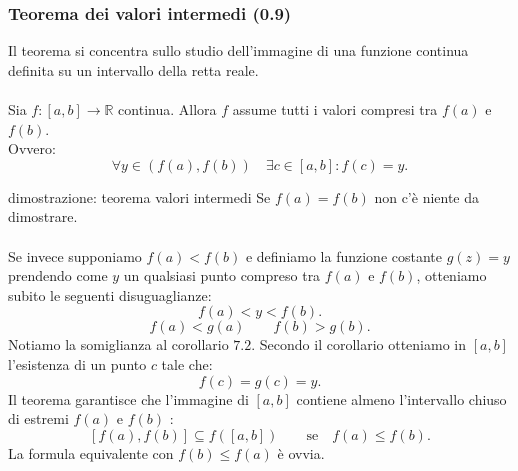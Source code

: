 \documentclass[x11names]{article}
\begin{document}
\begin{center}
\colorbox{myred}{\begin{minipage}{5.75in}
\begin{redes}{}
\subsubsection{Teorema dei valori intermedi (0.9)}
Il teorema si concentra sullo studio dell'immagine di una funzione continua definita su un intervallo  della retta reale.
\\ \\
Sia $f:\left[a,b\right] \rightarrow \mathbb{R}$ continua. Allora $f$ assume tutti i valori compresi tra $f\left(a\right)$ e $f\left(b\right)$.
\\
Ovvero:
\[
	\forall y \in \left(f\left(a\right),f\left(b\right)\right) \quad \exists c \in \left[a,b\right] : f\left(c\right) = y
.\] 


\begin{center}

\end{center}
\end{redes}
\end{minipage}}        
\end{center}


\begin{es}{dimostrazione: teorema valori intermedi}
Se $f\left(a\right) = f\left(b\right)$ non c'è niente da dimostrare.
\\ \\
Se invece supponiamo $f\left(a\right) < f\left(b\right)$ e definiamo la funzione costante $g\left(z\right) = y$ prendendo come $y$ un qualsiasi punto compreso tra $f\left(a\right)$ e $f\left(b\right)$, otteniamo subito le seguenti disuguaglianze:
\[
f\left(a\right) < y < f\left(b\right)
.\] 
\[
f\left(a\right) < g\left(a\right) \qquad f\left(b\right) > g\left(b\right)
.\] 
Notiamo la somiglianza al corollario $7.2$. Secondo il corollario otteniamo in  $\left[a,b\right]$ l'esistenza di un punto $c$ tale che:
\[
f\left(c\right) = g\left(c\right) = y
.\] 
Il teorema garantisce che l'immagine di $\left[a,b\right]$ contiene almeno l'intervallo chiuso di estremi $f\left(a\right)$ e $f\left(b\right)$ :
\[
	\left[f\left(a\right),f\left(b\right)\right] \subseteq f\left(\left[a,b\right]\right) \qquad \text{se} \quad f\left(a\right) \leq f\left(b\right)
.\] 
La formula equivalente con $f\left(b\right) \leq f\left(a\right)$ è ovvia.
\end{es}
\end{document}
